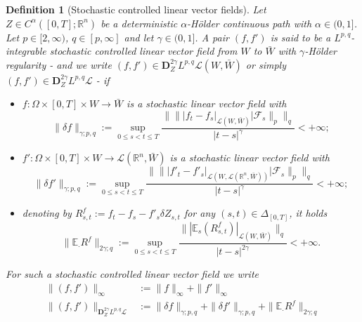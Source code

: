 \documentclass[11pt,a4paper]{article}
\newcommand{\R}{\mathbb{R}}
\newcommand{\E}{\mathbb{E}}
\newtheorem{defn}{Definition}[section]
\theoremstyle{plain}
\begin{document}
\begin{defn}[Stochastic controlled linear vector fields] \label{def:stochasticcontrolledroughpaths_chapter2} 
Let $Z \in {C}^\alpha([0,T];\R^n)$ be a deterministic $\alpha$-Hölder continuous path with $\alpha \in (0,1]$. Let $p\in[2,\infty)$, $q \in [p,\infty]$ and let $\gamma\in(0,1]$. A pair $(f,f')$ is said to be a $L^{p,q}$-integrable stochastic controlled linear vector field from $W$ to $\bar{W}$ with $\gamma$-H\"older regularity - and we write $(f,f') \in \mathbf{D}^{2\gamma}_ZL^{p,q} \mathscr{L} (W,\bar{W})$ or simply $(f,f') \in \mathbf{D}^{2\gamma}_ZL^{p,q} \mathscr{L}$ - if \begin{itemize}
    \item[a)] $f:\Omega \times [0,T] \times W \to \bar{W}$ is a stochastic linear vector field with \begin{equation*} \label{eq:normofcontrolledvectorfields1}
        \|\delta f\|_{\gamma;p,q}:=\sup_{0\le s<t\le T} \frac{\|\||f_t-f_s|_{\mathscr{L}(W,\bar{W})}|\mathcal{F}_s\|_p\|_{q}}{|t-s|^{\gamma}}<+\infty;
    \end{equation*}
    \item[b)] $f':\Omega \times [0,T] \times W \to \mathscr{L}(\R^n, \bar{W})$ is a stochastic linear vector field with \begin{equation*} \label{eq:normofcontrolledvectorfields2}
        \|\delta f'\|_{\gamma;p,q}:=\sup_{0\le s<t\le T} \frac{\|\||f'_t-f'_s|_{\mathscr{L}(W,\mathscr{L}(\R^n,\bar{W}))}|\mathcal{F}_s\|_p\|_{q}}{|t-s|^{\gamma}}<+\infty;
    \end{equation*}
    \item[c)] denoting by $R_{s,t}^f:=f_t-f_s-f'_s\delta Z_{s,t}$ for any $(s,t)\in \Delta_{[0,T]}$, it holds \begin{equation*} \label{eq:remainderofstochasticcontrolledlinearvectorfields} \|\E_{\cdot}R^f\|_{2\gamma;q}:=\sup_{0\le s<t\le T} \frac{\||\E_s(R_{s,t}^f)|_{\mathscr{L}(W,\bar{W})}\|_{q}}{|t-s|^{2\gamma}}<+\infty.
    \end{equation*}  
\end{itemize} 
For such a stochastic controlled linear vector field we write \begin{align*}
    \|(f,f')\|_\infty &:= \|f\|_\infty + \|f'\|_\infty \\ 
    \|(f,f')\|_{\mathbf{D}_Z^{2\gamma}L^{p,q} \mathscr{L}} &:= \|\delta f\|_{\gamma;p,q} + \|\delta f'\|_{\gamma;p,q} + \|\E_{\cdot}R^f\|_{2\gamma;q} \\

\end{align*}
\end{defn}
\end{document}
